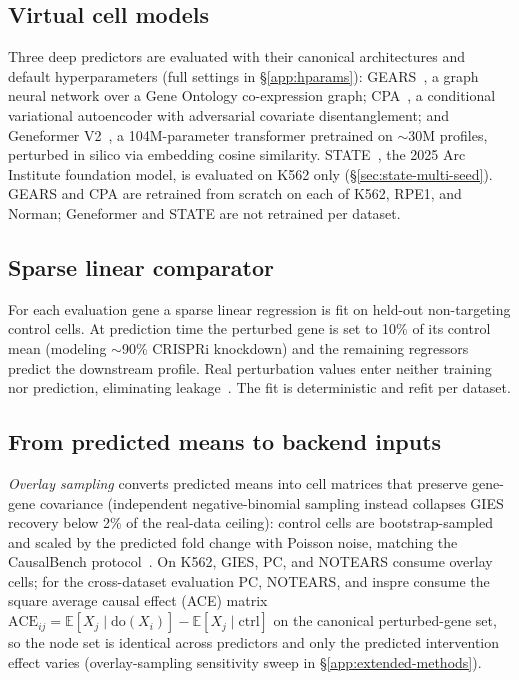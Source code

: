 \documentclass{article}
\theoremstyle{plain}
\theoremstyle{definition}
\theoremstyle{remark}
\begin{document}
\subsection{Virtual cell models}
Three deep predictors are evaluated with their canonical architectures and default hyperparameters (full settings in \S\ref{app:hparams}): GEARS~\citep{roohani2024gears}, a graph neural network over a Gene Ontology co-expression graph; CPA~\citep{lotfollahi2023cpa}, a conditional variational autoencoder with adversarial covariate disentanglement; and Geneformer V2~\citep{theodoris2023geneformer}, a 104M-parameter transformer pretrained on $\sim$30M profiles, perturbed in silico via embedding cosine similarity. STATE~\citep{adduri2025state,arc2025state}, the 2025 Arc Institute foundation model, is evaluated on K562 only (\S\ref{sec:state-multi-seed}). GEARS and CPA are retrained from scratch on each of K562, RPE1, and Norman; Geneformer and STATE are not retrained per dataset.

\subsection{Sparse linear comparator}
For each evaluation gene a sparse linear regression is fit on held-out non-targeting control cells. At prediction time the perturbed gene is set to 10\% of its control mean (modeling $\sim$90\% CRISPRi knockdown) and the remaining regressors predict the downstream profile. Real perturbation values enter neither training nor prediction, eliminating leakage~\citep{zou2005elasticnet}. The fit is deterministic and refit per dataset.

\subsection{From predicted means to backend inputs}
\emph{Overlay sampling} converts predicted means into cell matrices that preserve gene-gene covariance (independent negative-binomial sampling instead collapses GIES recovery below 2\% of the real-data ceiling): control cells are bootstrap-sampled and scaled by the predicted fold change with Poisson noise, matching the CausalBench protocol~\citep{chevalley2025causalbench}. On K562, GIES, PC, and NOTEARS consume overlay cells; for the cross-dataset evaluation PC, NOTEARS, and inspre consume the square average causal effect (ACE) matrix $\mathrm{ACE}_{ij}=\mathbb{E}[X_j\mid\mathrm{do}(X_i)]-\mathbb{E}[X_j\mid\mathrm{ctrl}]$ on the canonical perturbed-gene set, so the node set is identical across predictors and only the predicted intervention effect varies (overlay-sampling sensitivity sweep in \S\ref{app:extended-methods}).
\end{document}
